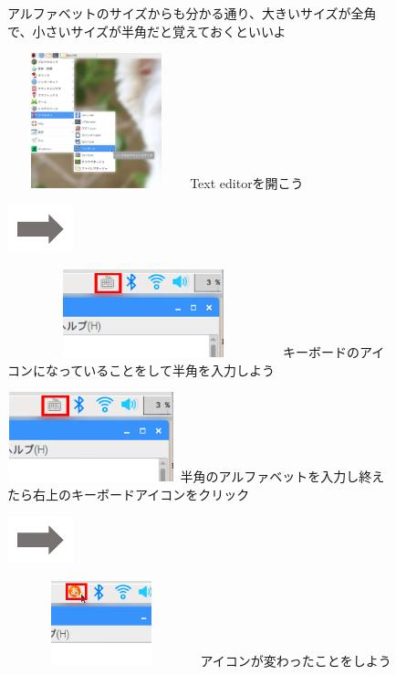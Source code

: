 \documentclass[a4paper,12pt]{jarticle}
\begin{document}
\begin{figure}[ht]
\begin{minipage}{16.578cm}
    アルファベットのサイズからも分かる通り、大きいサイズが全角で、小さいサイズが半角だと覚えておくといいよ
  \end{minipage}
  \begin{minipage}{5.578cm}
    \includegraphics[width=5.172cm,height=3.924cm]{textbook-img067.png}
     Text editorを開こう
  \end{minipage}
  \includegraphics[width=1.919cm,height=1.365cm]{textbook-img053.png}
  \begin{minipage}{7.931cm}
    \includegraphics[width=7.868cm,height=2.534cm]{textbook-img059.png}
    キーボードのアイコンになっていることをして半角を入力しよう
  \end{minipage}
  \begin{minipage}{6.345cm}
    \includegraphics[width=4.889cm,height=2.596cm]{textbook-img059.png}
    半角のアルファベットを入力し終えたら右上のキーボードアイコンをクリック
  \end{minipage}
  \includegraphics[width=1.919cm,height=1.365cm]{textbook-img053.png}
  \begin{minipage}{7.524cm}
    \includegraphics[width=5.471cm,height=2.469cm]{textbook-img062.png}
    アイコンが変わったことをしよう
  \end{minipage}


\end{figure}
\end{document}
